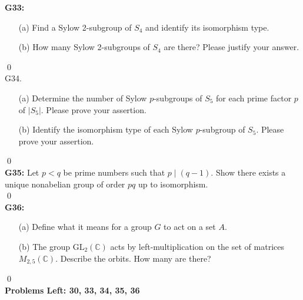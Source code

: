 \textbf{G33:} \begin{itemize}
	\item[(a)] Find a Sylow 2-subgroup of $S_{4}$ and identify its isomorphism type.
	\item[(b)] How many Sylow 2-subgroups of $S_{4}$ are there? Please justify your answer.
\end{itemize}
\soln
\qed\\


G34. \begin{itemize}
	\item[(a)] Determine the number of Sylow $p$-subgroups of $S_{5}$ for each prime factor $p$ of $\left|S_{5}\right|$. Please prove your assertion.
	\item[(b)] Identify the isomorphism type of each Sylow $p$-subgroup of $S_{5}$. Please prove your assertion.
\end{itemize}
\soln
\qed\\


\textbf{G35:} Let $p<q$ be prime numbers such that $p \mid(q-1)$. Show there exists a unique nonabelian group of order $p q$ up to isomorphism.\\
\soln
\qed\\


\textbf{G36:}
\begin{itemize}
	\item[(a)] Define what it means for a group $G$ to act on a set $A$.
	\item[(b)] The group $\mathrm{GL}_{2}(\mathbb{C})$ acts by left-multiplication on the set of matrices $M_{2,5}(\mathbb{C})$. Describe the orbits. How many are there?
\end{itemize}
\soln
\qed\\


\textbf{Problems Left: 30, 33, 34, 35, 36}